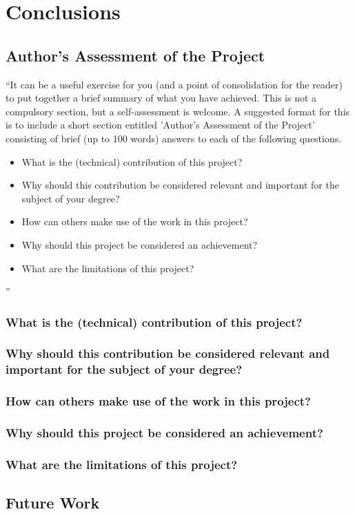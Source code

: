 \chapter{Conclusions}\label{ch:conclusions}
\section{Author's Assessment of the Project}
``It can be a useful exercise for you (and a point of consolidation for the reader) to put together a brief summary of what you have achieved. This is not a compulsory section, but a self-assessment is welcome. A suggested format for this is to include a short section entitled 'Author's Assessment of the Project' consisting of brief (up to 100 words) answers to each of the following questions.

\begin{itemize}
\item What is the (technical) contribution of this project?
\item Why should this contribution be considered relevant and important for the subject of your degree?
\item How can others make use of the work in this project?
\item Why should this project be considered an achievement?
\item What are the limitations of this project?
\end{itemize}''
\subsection*{What is the (technical) contribution of this project?}

\subsection*{Why should this contribution be considered relevant and important for the subject of your degree?}

\subsection*{How can others make use of the work in this project?}

\subsection*{Why should this project be considered an achievement?}

\subsection*{What are the limitations of this project?}

\section{Future Work}
